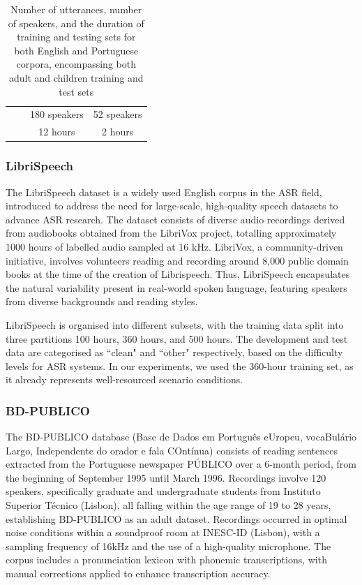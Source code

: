 \begin{table}[h]
\begin{center}
\begin{tabular}{cccc}
                                &                                                                              & 180 speakers      & 52 speakers     \\
                                &                                                                              & 12 hours          & 2 hours         \\ \hline
    \end{tabular}
    \caption{Number of utterances, number of speakers, and the duration of training and testing sets for both English and Portuguese corpora, encompassing both adult and children training and test sets}
\label{tab:statistics_exp1}
\end{center}

    \end{table}


\subsubsection*{LibriSpeech}
The LibriSpeech dataset \cite{librispeech} is a widely used English corpus in the \ac{ASR} field, introduced to address the need for large-scale, high-quality speech datasets to advance \ac{ASR} research. The dataset consists of diverse audio recordings derived from audiobooks obtained from the LibriVox project, totalling approximately 1000 hours of labelled audio sampled at 16 k\ac{Hz}. LibriVox, a community-driven initiative, involves volunteers reading and recording around 8,000 public domain books at the time of the creation of Librispeech. Thus, LibriSpeech encapsulates the natural variability present in real-world spoken language, featuring speakers from diverse backgrounds and reading styles.

LibriSpeech is organised into different subsets, with the training data split into three partitions 100 hours, 360 hours, and 500 hours. The development and test data are categorised as ``clean" and ``other" respectively, based on the difficulty levels for \ac{ASR} systems. In our experiments, we used the 360-hour training set, as it already represents well-resourced scenario conditions.


\subsubsection*{BD-PUBLICO}
The BD-PUBLICO database (Base de Dados em Português eUropeu, vocaBulário Largo, Independente do orador e fala COntínua) \cite{bdpublico} consists of reading sentences extracted from the Portuguese newspaper PÚBLICO over a 6-month period, from the beginning of September 1995 until March 1996. Recordings involve 120 speakers, specifically graduate and undergraduate students from Instituto Superior Técnico (Lisbon), all falling within the age range of 19 to 28 years, establishing BD-PUBLICO as an adult dataset. Recordings occurred in optimal noise conditions within a soundproof room at INESC-ID (Lisbon), with a sampling frequency of 16kHz and the use of a high-quality microphone. The corpus includes a pronunciation lexicon with phonemic transcriptions, with manual corrections applied to enhance transcription accuracy.

